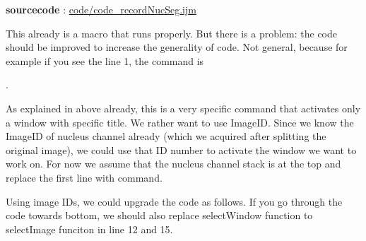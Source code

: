 \textbf{sourcecode} : \href{https://github.com/miura/BIAS_Nucleus_Segmentation/blob/struct_authorea/code_recordNucSeg.ijm}{code/code\_recordNucSeg.ijm}

This already is a macro that runs properly. But there is a problem: the code should be improved to increase the generality of code. Not general, because for example if you see the line 1, the command is

.

As explained in above already, this is a very specific command that activates only a window with specific title. We rather want to use ImageID. Since we know the ImageID of nucleus channel already (which we acquired after splitting the original image), we could use that ID number to activate the window we want to work on. For now we assume that the nucleus channel stack is at the top and replace the first line with  command.

Using image IDs, we could upgrade the code as follows.  If you go through the code towards bottom, we should also replace selectWindow function to selectImage funciton in line 12 and 15.